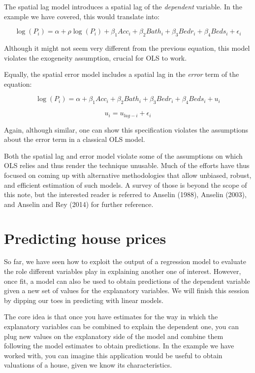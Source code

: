 \documentclass[
  letterpaper,
  krantz2]{style/krantz}
\begin{document}
The spatial lag model introduces a spatial lag of the \emph{dependent}
variable. In the example we have covered, this would translate into:

\[
\log(P_i) = \alpha + \rho \log(P_i) + \beta_1 Acc_i + \beta_2 Bath_i + \beta_3 Bedr_i + \beta_4 Beds_i + \epsilon_i
\]

Although it might not seem very different from the previous equation,
this model violates the exogeneity assumption, crucial for OLS to work.

Equally, the spatial error model includes a spatial lag in the
\emph{error} term of the equation:

\[
\log(P_i) = \alpha + \beta_1 Acc_i + \beta_2 Bath_i + \beta_3 Bedr_i + \beta_4 Beds_i + u_i
\]

\[
u_i = u_{lag-i} + \epsilon_i
\]

Again, although similar, one can show this specification violates the
assumptions about the error term in a classical OLS model.

Both the spatial lag and error model violate some of the assumptions on
which OLS relies and thus render the technique unusable. Much of the
efforts have thus focused on coming up with alternative methodologies
that allow unbiased, robust, and efficient estimation of such models. A
survey of those is beyond the scope of this note, but the interested
reader is referred to Anselin (1988), Anselin (2003), and Anselin and
Rey (2014) for further reference.

\hypertarget{predicting-house-prices}{%
\section{Predicting house prices}\label{predicting-house-prices}}

So far, we have seen how to exploit the output of a regression model to
evaluate the role different variables play in explaining another one of
interest. However, once fit, a model can also be used to obtain
predictions of the dependent variable given a new set of values for the
explanatory variables. We will finish this session by dipping our toes
in predicting with linear models.

The core idea is that once you have estimates for the way in which the
explanatory variables can be combined to explain the dependent one, you
can plug new values on the explanatory side of the model and combine
them following the model estimates to obtain predictions. In the example
we have worked with, you can imagine this application would be useful to
obtain valuations of a house, given we know its characteristics.
\end{document}
